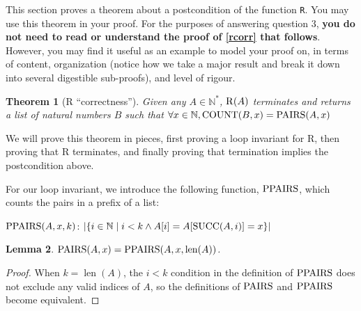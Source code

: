 \documentclass[boldsans]{article}
\newtheorem{theorem}{Theorem}[section]
\newtheorem{lemma}[theorem]{Lemma}
\newcommand{\N}{\mathbb{N}}
\newcommand{\AND}{\wedge}
\DeclareMathOperator{\len}{len}
\begin{document}
This section proves a theorem about a postcondition of the function \texttt{R}. You may use this theorem in your proof. For the purposes of answering question 3, \textbf{you do not need to read or understand the proof of \autoref{rcorr} that follows}. However, you may find it useful as an example to model your proof on, in terms of content, organization (notice how we take a major result and break it down into several digestible sub-proofs), and level of rigour.

\begin{theorem}[R ``correctness'']
\label{rcorr}
Given any $A \in \N^*$, $\operatorname{R}(A)$ terminates and returns a list of natural numbers $B$ such that 
$\forall x \in \N, \COUNT(B, x) = \pairs(A, x)$
\end{theorem}

We will prove this theorem in pieces, first proving a loop invariant for R, then proving that R terminates, and finally proving that termination implies the postcondition above.

For our loop invariant, we introduce the following function, $\operatorname{PPAIRS}$, which counts the pairs in a prefix of a list:

$\operatorname{PPAIRS}(A, x, k)$: $|  \{ i \in \N \mid i < k \AND A[i] = A[\SUCC(A, i)] = x\} |$


\begin{lemma}
\label{ppairidentity}
$\pairs(A, x) = \ppairs(A, x, \len(A))$.
\end{lemma}
\begin{proof}
When $k = \len(A)$, the $i < k$ condition in the definition of $\operatorname{PPAIRS}$ does not exclude any valid indices of $A$, so the definitions of $\operatorname{PAIRS}$ and $\operatorname{PPAIRS}$ become equivalent.
\end{proof}
\end{document}
